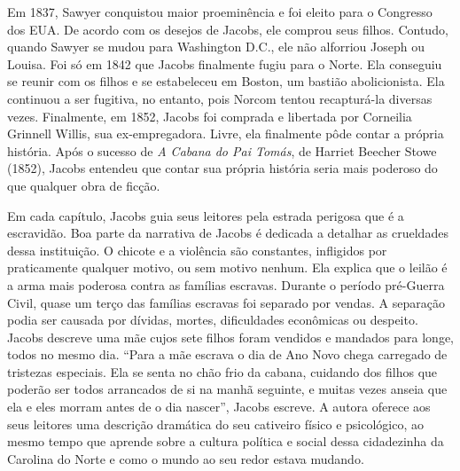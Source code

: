Em 1837, Sawyer conquistou maior proeminência e foi eleito para o
Congresso dos EUA. De acordo com os desejos de Jacobs, ele comprou seus
filhos. Contudo, quando Sawyer se mudou para Washington D.C., ele não
alforriou Joseph ou Louisa. Foi só em 1842 que Jacobs finalmente fugiu
para o Norte. Ela conseguiu se reunir com os filhos e se estabeleceu em
Boston, um bastião abolicionista. Ela continuou a ser fugitiva, no
entanto, pois Norcom tentou recapturá-la diversas vezes. Finalmente, em
1852, Jacobs foi comprada e libertada por Corneilia Grinnell Willis, sua
ex-empregadora. Livre, ela finalmente pôde contar a própria história.
Após o sucesso de \emph{A Cabana do Pai Tomás}, de Harriet Beecher Stowe
(1852), Jacobs entendeu que contar sua própria história seria mais
poderoso do que qualquer obra de ficção.

Em cada capítulo, Jacobs guia seus leitores pela estrada perigosa que é
a escravidão. Boa parte da narrativa de Jacobs é dedicada a detalhar as
crueldades dessa instituição. O chicote e a violência são constantes,
infligidos por praticamente qualquer motivo, ou sem motivo nenhum. Ela
explica que o leilão é a arma mais poderosa contra as famílias escravas.
Durante o período pré-Guerra Civil, quase um terço das famílias escravas
foi separado por vendas. A separação podia ser causada por dívidas,
mortes, dificuldades econômicas ou despeito. Jacobs descreve uma mãe
cujos sete filhos foram vendidos e mandados para longe, todos no mesmo
dia. ``Para a mãe escrava o dia de Ano Novo chega carregado de tristezas
especiais. Ela se senta no chão frio da cabana, cuidando dos filhos que
poderão ser todos arrancados de si na manhã seguinte, e muitas vezes
anseia que ela e eles morram antes de o dia nascer'', Jacobs escreve. A
autora oferece aos seus leitores uma descrição dramática do seu
cativeiro físico e psicológico, ao mesmo tempo que aprende sobre a
cultura política e social dessa cidadezinha da Carolina do Norte e como
o mundo ao seu redor estava mudando.

